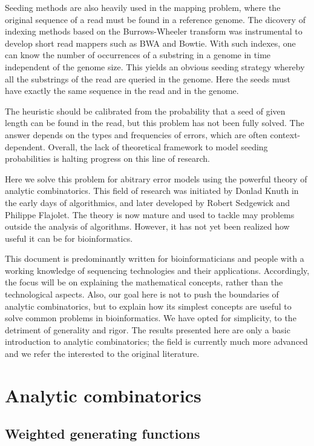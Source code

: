 \documentclass{article}
\begin{document}
Seeding methods are also heavily used in the mapping problem, where the
original sequence of a read must be found in a reference genome. The
dicovery of indexing methods based on the Burrows-Wheeler transform was
instrumental to develop short read mappers such as BWA and Bowtie. With
such indexes, one can know the number of occurrences of a substring in a
genome in time independent of the genome size. This yields an obvious
seeding strategy whereby all the substrings of the read are queried in the
genome. Here the seeds must have exactly the same sequence in the read and
in the genome.

The heuristic should be calibrated from the probability that a seed of
given length can be found in the read, but this problem has not been fully
solved. The answer depends on the types and frequencies of errors, which
are often context-dependent. Overall, the lack of theoretical framework to
model seeding probabilities is halting progress on this line of research.

Here we solve this problem for abitrary error models using the powerful
theory of analytic combinatorics. This field of research was initiated by
Donlad Knuth in the early days of algorithmics, and later developed by
Robert Sedgewick and Philippe Flajolet. The theory is now mature and used
to tackle may problems outside the analysis of algorithms. However, it
has not yet been realized how useful it can be for bioinformatics.

This document is predominantly written for bioinformaticians and people
with a working knowledge of sequencing technologies and their applications.
Accordingly, the focus will be on explaining the mathematical concepts,
rather than the technological aspects. Also, our goal here is not to push
the boundaries of analytic combinatorics, but to explain how its simplest
concepts are useful to solve common problems in bioinformatics. We have
opted for simplicity, to the detriment of generality and rigor. The
results presented here are only a basic introduction to analytic
combinatorics; the field is currently much more advanced and we refer the
interested to the original literature.

\section{Analytic combinatorics}
\label{sec:anal}

\subsection{Weighted generating functions}
\label{subsec:WGF}
\end{document}
